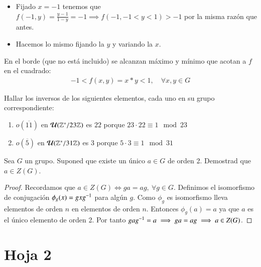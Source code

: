 \begin{ex}[H1.2]
\begin{itemize}
\begin{itemize}
			\item Fijado $x = -1$ tenemos que $f(-1, y) = \frac{y-1}{1-y} = -1 \implies f(-1, -1 < y < 1) > -1$ por la misma razón que antes.
			\item Hacemos lo mismo fijando la $y$ y variando la $x$.
		\end{itemize}
		En el borde (que no está incluido) se alcanzan máximo y mínimo que acotan a $f$ en el cuadrado:
		\begin{align*}
			-1 < f(x,y) = x \ast y < 1,\quad \forall x, y \in G
		\end{align*}
	\end{itemize}
\end{ex}

\begin{ex}[H1.3]Hallar los inversos de los siguientes elementos, cada uno en su grupo correspondiente:
	\begin{enumerate}
		\item $o(\overline{11})$ en $\mathcal{U}(\mathbb{Z}^\ast/23\mathbb{Z})$ es $22$ porque $23 \cdot 22 \equiv 1 \mod 23$
		\item $o(\overline{5})$ en $\mathcal{U}(\mathbb{Z}^\ast/31\mathbb{Z})$ es $3$ porque $5 \cdot 3 \equiv 1 \mod 31$
	\end{enumerate}
\end{ex}

\begin{ex}[H1.33]
	\label{ex:h1.33}
	Sea $G$ un grupo. Suponed que existe un único $a \in G$ de orden 2. Demostrad que $a \in Z(G)$.
\end{ex}

\begin{proof}
	Recordamos que $a \in Z(G) \iff ga = ag,\ \forall g \in G$. Definimos el isomorfismo de conjugación $\phi_g (x) = gxg^{-1}$ para algún $g$. Como $\phi_g$ es isomorfismo lleva elementos de orden $n$ en elementos de orden $n$. Entonces $\phi_g(a) = a$ ya que $a$ es el único elemento de orden 2. Por tanto $gag^{-1} = a \implies ga = ag \implies a \in Z(G)$.
\end{proof}

\section{Hoja 2}

